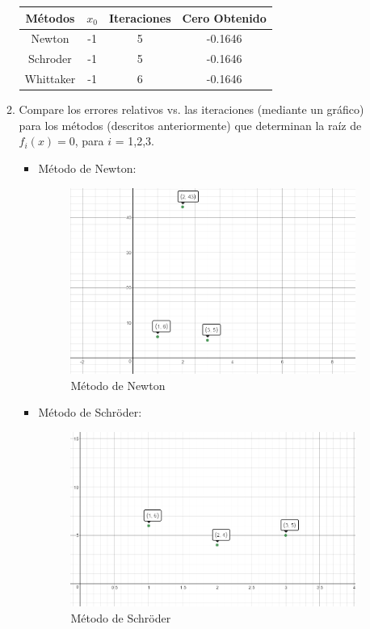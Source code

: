 \documentclass{udpreport}
\begin{document}
\begin{enumerate}
\begin{enumerate}
		\begin{table}[H]
			\centering
			\begin{tabular}{|c|c|c|c|}
				\hline
				Métodos & $x_{0}$ & Iteraciones & Cero Obtenido \\
				\hline
				Newton & -1 & 5 & -0.1646 \\
				\hline
				Schroder & -1 & 5 & -0.1646\\
				\hline
				Whittaker & -1 & 6 & -0.1646 \\
				\hline				
			\end{tabular}
		\end{table}		
\newpage			
		\item Compare los errores relativos vs. las iteraciones (mediante un gráfico) para los métodos (descritos
			anteriormente) que determinan la raíz de $f_{i}(x)=0$, para $i$ = 1,2,3.	
			\begin{itemize}
				\item Método de Newton:
				\begin{figure}[H]
					\centering	
						\includegraphics[width=10cm]{NewtonEj6} 
						\caption{Método de Newton}
				\end{figure}
								
				\item Método de Schröder: 
				 \begin{figure}[H]
					\centering
					\includegraphics[width=10cm]{SchroderEj6}
					\caption{Método de Schröder}
				\end{figure}	
				 

\end{itemize}
\end{enumerate}
\end{enumerate}
\end{document}
